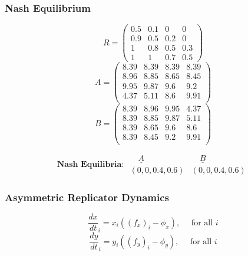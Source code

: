 \begin{frame}
    \frametitle{Nash Equilibrium}
    \centering

    \scriptsize
    \begin{equation*}
        R =  
        \begin{pmatrix}
            0.5 & 0.1 & 0 & 0 \\
            0.9 & 0.5 & 0.2 & 0 \\
            1 & 0.8 & 0.5 & 0.3 \\
            1 & 1 & 0.7 & 0.5
        \end{pmatrix}
    \end{equation*}
    \begin{equation*}
        A = 
        \begin{pmatrix}
            8.39 & 8.39 & 8.39 & 8.39 \\
            8.96 & 8.85 & 8.65 & 8.45 \\
            9.95 & 9.87 & 9.6  & 9.2  \\
            4.37 & 5.11 & 8.6  & 9.91 \\
        \end{pmatrix}
    \end{equation*}
    \begin{equation*}
        B = 
        \begin{pmatrix}
            8.39 & 8.96 & 9.95 & 4.37 \\
            8.39 & 8.85 & 9.87 & 5.11 \\
            8.39 & 8.65 & 9.6 &  8.6 \\ 
            8.39 & 8.45 & 9.2 &  9.91 \\
        \end{pmatrix}
    \end{equation*}

    \begin{equation*}
        \textbf{Nash Equilibria: } 
        \begin{array}{cc}
            \underline{\quad A \quad} & \underline{\quad B \quad} \\
            (0, 0, 0.4, 0.6) & (0, 0, 0.4, 0.6) 
        \end{array}
    \end{equation*}
\end{frame}


\begin{frame}
    \frametitle{Asymmetric Replicator Dynamics}
    \centering

    \[
        \frac{dx}{dt}_i = x_i((f_x)_i - \phi_x), \quad \text{ for all }i
    \]
    \[
        \frac{dy}{dt}_i = y_i((f_y)_i - \phi_y), \quad \text{ for all }i
    \]
    
\end{frame}


